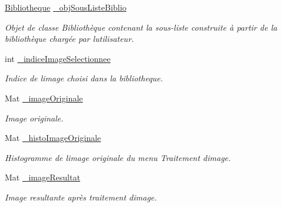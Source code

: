 \begin{DoxyCompactItemize}
\mbox{\label{classMainWindow_ad6dc0e2f10d08ebe158f027eb757688e}} 
\hyperlink{classBibliotheque}{Bibliotheque} \hyperlink{classMainWindow_ad6dc0e2f10d08ebe158f027eb757688e}{\+\_\+obj\+Sous\+Liste\+Biblio}
\begin{DoxyCompactList}\small\item\em Objet de classe Bibliothèque contenant la sous-\/liste construite à partir de la bibliothèque chargée par l\textquotesingle{}utilisateur. \end{DoxyCompactList}\item 
\mbox{\label{classMainWindow_a6fca176578fd3004f28deed54a983ca3}} 
int \hyperlink{classMainWindow_a6fca176578fd3004f28deed54a983ca3}{\+\_\+indice\+Image\+Selectionnee}
\begin{DoxyCompactList}\small\item\em Indice de l\textquotesingle{}image choisi dans la bibliotheque. \end{DoxyCompactList}\item 
\mbox{\label{classMainWindow_aee8761b9ae0b6541b321d6512adf6f6b}} 
Mat \hyperlink{classMainWindow_aee8761b9ae0b6541b321d6512adf6f6b}{\+\_\+image\+Originale}
\begin{DoxyCompactList}\small\item\em Image originale. \end{DoxyCompactList}\item 
\mbox{\label{classMainWindow_af221480371f407be5563d9396ab7755e}} 
Mat \hyperlink{classMainWindow_af221480371f407be5563d9396ab7755e}{\+\_\+histo\+Image\+Originale}
\begin{DoxyCompactList}\small\item\em Histogramme de l\textquotesingle{}image originale du menu Traitement d\textquotesingle{}image. \end{DoxyCompactList}\item 
\mbox{\label{classMainWindow_a26822b1b1e1967e7aab7d3d8cbbca9ed}} 
Mat \hyperlink{classMainWindow_a26822b1b1e1967e7aab7d3d8cbbca9ed}{\+\_\+image\+Resultat}
\begin{DoxyCompactList}\small\item\em Image resultante après traitement d\textquotesingle{}image. \end{DoxyCompactList}\item 

\end{DoxyCompactItemize}
